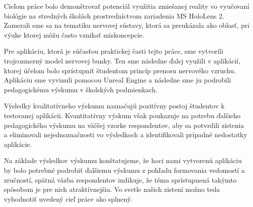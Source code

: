 Cieľom práce bolo demonštrovať potenciál využitia zmiešanej reality vo vyučovaní biológie na stredných školách prostredníctvom zariadenia MS HoloLens 2. Zamerali sme sa na tematiku nervovej sústavy, ktorá sa preukázala ako 
oblasť, pri výuke ktorej môžu často vznikať miskoncepcie.

Pre aplikáciu, ktorá je súčasťou praktickej časti tejto práce, sme vytvorili trojrozmerný model nervovej bunky. Ten sme následne ďalej využili v aplikácií, ktorej účelom bolo sprístupniť študentom princíp prenosu nervového
vzruchu. 
Aplikáciu sme vyvinuli pomocou Unreal Engine a následne sme ju podrobili pedagogickému výskumu v školských podmienkach. 

Výsledky kvalitatívneho výskumu naznačujú pozitívny postoj študentov k testovanej aplikácii.
Kvantitatívny výskum však poukazuje na potrebu ďalšieho pedagogického výskumu na väčšej vzorke respondentov, aby sa potvrdili zistenia a eliminovali nejednoznačnosti vo výsledkoch a identifikovali prípadné nedostatky aplikácie.

Na základe výsledkov výskumu konštatujeme, že hoci nami vytvorenú aplikáciu by bolo potrebné podrobiť ďalšiemu výskumu z pohľadu formovania vedomostí a zručností, 
spätná väzba respondentov indikuje, že téma sprístupnená takýmto spôsobom je pre nich atraktívnejšia. 
Vo svetle našich zistení možno teda vyhodnotiť uvedený cieľ práce ako splnený.


